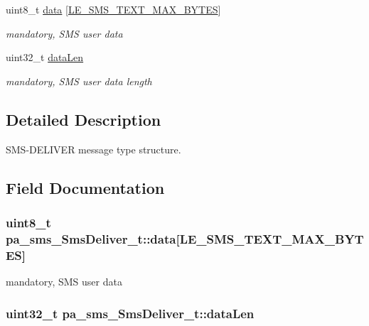 \begin{DoxyCompactItemize}
uint8\+\_\+t \hyperlink{structpa__sms___sms_deliver__t_a8fb224f27daa9394478f84ce49f4eaa6}{data} \mbox{[}\hyperlink{le__sms__interface_8h_a0dc5c2cec7c1fb166c47393fbb07e43f}{L\+E\+\_\+\+S\+M\+S\+\_\+\+T\+E\+X\+T\+\_\+\+M\+A\+X\+\_\+\+B\+Y\+T\+ES}\mbox{]}
\begin{DoxyCompactList}\small\item\em mandatory, S\+MS user data \end{DoxyCompactList}\item 
uint32\+\_\+t \hyperlink{structpa__sms___sms_deliver__t_aa04af47dca4e645a8ef31dfe2f0a7d17}{data\+Len}
\begin{DoxyCompactList}\small\item\em mandatory, S\+MS user data length \end{DoxyCompactList}\end{DoxyCompactItemize}


\subsection{Detailed Description}
S\+M\+S-\/\+D\+E\+L\+I\+V\+ER message type structure. 

\subsection{Field Documentation}
\subsubsection[{\texorpdfstring{data}{data}}]{\setlength{\rightskip}{0pt plus 5cm}uint8\+\_\+t pa\+\_\+sms\+\_\+\+Sms\+Deliver\+\_\+t\+::data\mbox{[}{\bf L\+E\+\_\+\+S\+M\+S\+\_\+\+T\+E\+X\+T\+\_\+\+M\+A\+X\+\_\+\+B\+Y\+T\+ES}\mbox{]}}\hypertarget{structpa__sms___sms_deliver__t_a8fb224f27daa9394478f84ce49f4eaa6}{}\label{structpa__sms___sms_deliver__t_a8fb224f27daa9394478f84ce49f4eaa6}


mandatory, S\+MS user data 

\subsubsection[{\texorpdfstring{data\+Len}{dataLen}}]{\setlength{\rightskip}{0pt plus 5cm}uint32\+\_\+t pa\+\_\+sms\+\_\+\+Sms\+Deliver\+\_\+t\+::data\+Len}\hypertarget{structpa__sms___sms_deliver__t_aa04af47dca4e645a8ef31dfe2f0a7d17}{}\label{structpa__sms___sms_deliver__t_aa04af47dca4e645a8ef31dfe2f0a7d17}



